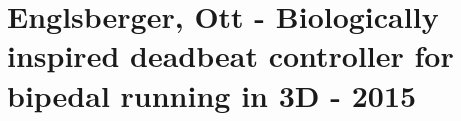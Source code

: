 \section{Englsberger, Ott - Biologically inspired deadbeat controller for bipedal running in 3D - 2015}